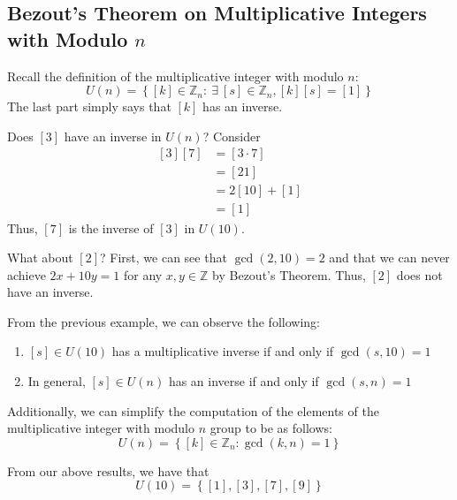 \subsection{Bezout's Theorem on Multiplicative Integers with Modulo \(n\)}

Recall the definition of the multiplicative integer with modulo \(n\):
\[
    U(n) = \left\{[k] \in \mathbb{Z}_n : \ \exists \ [s] \in \mathbb{Z}_n, [k][s] = [1]\right\}
\]
The last part simply says that \([k]\) has an inverse.

\begin{nexample}
    Does \([3]\) have an inverse in \(U(n)\)? Consider
    \[
    \begin{aligned}
        [3][7] &= [3 \cdot 7] \\
               &= [21] \\
               &= 2[10] + [1] \\
               &= [1]
    \end{aligned}
    \]
    Thus, \([7]\) is the inverse of \([3]\) in \(U(10)\).

    What about \([2]\)? First, we can see that \(\gcd(2, 10) = 2\) and that we can never achieve \(2x + 10y = 1\) for any \(x, y \in \mathbb{Z}\) by Bezout's Theorem. Thus, \([2]\) does not have an inverse.
\end{nexample}

From the previous example, we can observe the following:
\begin{enumerate}
    \item \([s] \in U(10)\) has a multiplicative inverse if and only if \(\gcd(s, 10) = 1\)
    \item In general, \([s] \in U(n)\) has an inverse if and only if \(\gcd(s, n) = 1\)
\end{enumerate}

Additionally, we can simplify the computation of the elements of the multiplicative integer with modulo \(n\) group to be as follows:
\[
    U(n) = \left\{[k] \in \mathbb{Z}_n : \gcd(k, n) = 1\right\}
\]

\begin{nexample}
    From our above results, we have that
    \[
        U(10) = \left\{[1], [3], [7], [9]\right\}
    \]
\end{nexample}

